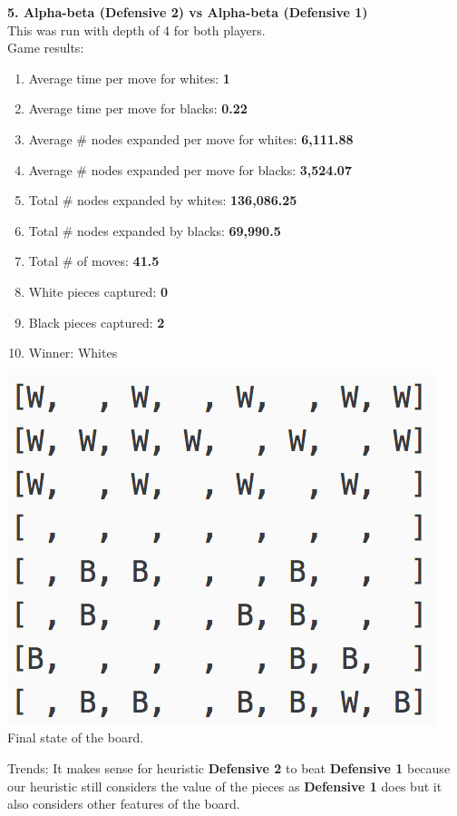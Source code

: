 \documentclass[11pt]{article}
\begin{document}
\pagebreak
\textbf{5. Alpha-beta (Defensive 2) vs Alpha-beta (Defensive 1)}\\
This was run with depth of 4 for both players.\\
Game results:\\
\begin{enumerate}
\item Average time per move for whites: \textbf{1}
\item Average time per move for blacks: \textbf{0.22}
\item Average \# nodes expanded per move for whites: \textbf{6,111.88}
\item Average \# nodes expanded per move for blacks:  \textbf{3,524.07}
\item Total \# nodes expanded by whites: \textbf{136,086.25}
\item Total \# nodes expanded by blacks: \textbf{69,990.5}
\item Total \# of moves: \textbf{41.5}
\item White pieces captured: \textbf{0}
\item Black pieces captured: \textbf{2}
\item Winner: Whites
\end{enumerate}
\begin{center}
\includegraphics[scale=1]{part2/ab-d2-vs-ab-d1.png}\\
Final state of the board.
\end{center}
Trends: It makes sense for heuristic \textbf{Defensive 2} to beat \textbf{Defensive 1} because our heuristic still considers the value of the pieces as \textbf{Defensive 1} does but it also considers other features of the board.\\
\end{document}

